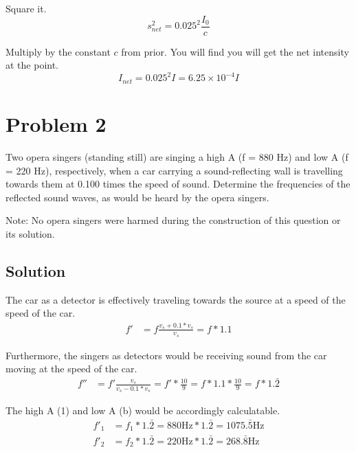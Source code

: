 \documentclass[12pt]{article}
\newcommand{\E}[1]{\times 10^{#1}}
\begin{document}
                Square it.
                \begin{equation}
                    s_{net}^2 = 0.025^2 \frac{I_0}{c}
                \end{equation}

                Multiply by the constant $c$ from prior.
                You will find you will get the net intensity at the point.
                \begin{equation}
                    I_{net} =   0.025^2 I
                        =   \boxed{6.25\E{-4} I}
                \end{equation}

    \pagebreak
    \section{Problem 2}
        Two opera singers (standing still) are singing a high A (f = 880 Hz) and low A (f = 220 Hz), respectively, when a car carrying a sound-reﬂecting wall is travelling towards them at 0.100 times the speed of sound. 
        Determine the frequencies of the reﬂected sound waves, as would be heard by the opera singers.
        
        Note: No opera singers were harmed during the construction of this question or its solution.

        \subsection{Solution}
            The car as a detector is effectively traveling towards the source at a speed of the speed of the car.
            \begin{align}
                f'  &=  f\frac{v_s + 0.1 * v_s}{v_s}
                    =   f * 1.1
            \end{align}

            Furthermore, the singers as detectors would be receiving sound from the car moving at the speed of the car.
            \begin{align}
                f'' &=  f'\frac{v_s}{v_s - 0.1 * v_s}
                    =   f' * \frac{10}{9}
                    =   f * 1.1 * \frac{10}{9}
                    =   f * 1.\bar{2}
            \end{align}

            The high A (1) and low A (b) would be accordingly calculatable.
            \begin{align}
                f'_1 &= f_1 * 1.\bar{2} = 880\unit{\hertz} * 1.\bar{2} = \boxed{1075.\bar{5}\unit{\hertz}}\\
                f'_2 &= f_2 * 1.\bar{2} = 220\unit{\hertz} * 1.\bar{2} = \boxed{268.\bar{8}\unit{\hertz}}
            \end{align}
\end{document}
